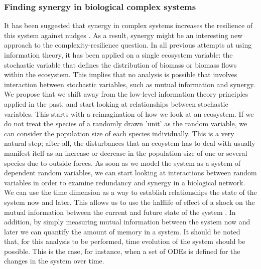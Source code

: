 \documentclass[../main.tex]{subfiles}
\begin{document}
\subsubsection{Finding synergy in biological complex systems}

It has been suggested that synergy in complex systems increases the resilience of this system against nudges \cite{quax2017quantifying}.
As a result, synergy might be an interesting new approach to the complexity-resilience question.
In all previous attempts at using information theory, it has been applied on a single ecosystem variable: the stochastic variable that defines the distribution of biomass or biomass flows within the ecosystem.
This implies that no analysis is possible that involves interaction between stochastic variables, such as mutual information and synergy.
We propose that we shift away from the low-level information theory principles applied in the past, and start looking at relationships between stochastic variables.
This starts with a reimagination of how we look at an ecosystem.
If we do not treat the species of a randomly drawn 'unit' as the random variable, we can consider the population size of each species individually.
This is a very natural step; after all, the disturbances that an ecoystem has to deal with usually manifest itelf as an increase or decrease in the population size of one or several species due to outside forces.
As soon as we model the system as a system of dependent random variables, we can start looking at interactions between random variables in order to examine redundancy and synergy in a biological network.
We can use the time dimension as a way to establish relationships the state of the system now and later.
This allows us to use the halflife of effect of a shock on the mutual information between the current and future state of the system \cite{QuaxPersonal}.
In addition, by simply measuring mutual information between the system now and later we can quantify the amount of memory in a system.
It should be noted that, for this analysis to be performed, time evolution of the system should be possible.
This is the case, for instance, when a set of ODEs is defined for the changes in the system over time.
\end{document}
